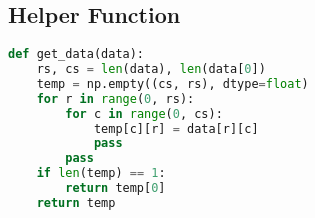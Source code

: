 \subsection{Helper Function}
\label{subsec:get-data-helper-function}
\begin{lstlisting}[language=python]
def get_data(data):
    rs, cs = len(data), len(data[0])
    temp = np.empty((cs, rs), dtype=float)
    for r in range(0, rs):
        for c in range(0, cs):
            temp[c][r] = data[r][c]
            pass
        pass
    if len(temp) == 1:
        return temp[0]
    return temp
\end{lstlisting}